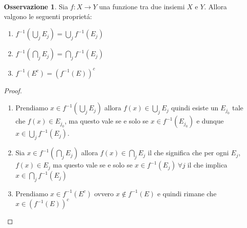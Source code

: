 \documentclass[11pt,a4paper]{report}
\theoremstyle{plain}
\theoremstyle{definition}
\newtheorem{oss}[thm]{Osservazione} %
\begin{document}
\begin{oss}
	Sia $f : X \rightarrow Y$ una funzione tra due insiemi $X$ e $Y$. Allora valgono le seguenti propriet\'a:
	\begin{enumerate}
		\item $f^{-1}(\bigcup\limits_jE_j) = \bigcup\limits_jf^{-1}(E_j)$
		\item $f^{-1}(\bigcap\limits_jE_j) = \bigcap\limits_jf^{-1}(E_j)$
		\item $f^{-1}(E^c) = (f^{-1}(E))^c$
	\end{enumerate}
\end{oss}
\begin{proof}
	\begin{enumerate}
		\item Prendiamo $x \in f^{-1}(\bigcup\limits_jE_j)$ allora $f(x) \in \bigcup\limits_jE_j$ quindi esiste un $E_{j_0}$ tale che $f(x) \in E_{j_0}$, ma questo vale se e solo se $x \in f^{-1}(E_{j_0})$ e dunque $x \in \bigcup\limits_jf^{-1}(E_j)$.
		\item Sia $x \in f^{-1}(\bigcap\limits_jE_j)$ allora $f(x) \in \bigcap\limits_jE_j$ il che significa che per ogni $E_j$, $f(x) \in E_j$ ma questo vale se e solo se $x \in f^{-1}(E_j)\ \forall j$ il che implica $x \in \bigcap\limits_jf^{-1}(E_j)$
		\item Prendiamo $x \in f^{-1}(E^c)$ ovvero $x \notin f^{-1}(E)$ e quindi rimane che $x \in (f^{-1}(E))^c$
	\end{enumerate}
\end{proof}
\end{document}
